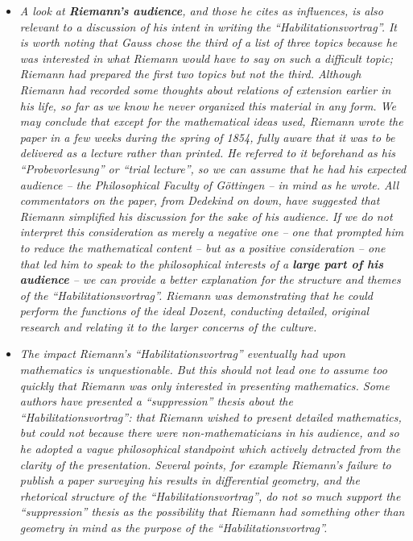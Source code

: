 \documentclass[12pt]{article}
\begin{document}
\begin{itemize}
\begin{itemize}
\item[]{\it A look at {\bf Riemann's audience}, and those he cites as influences, is also relevant to a discussion of his intent in writing the ``Habilitationsvortrag''. It is worth noting that Gauss chose the third of a list of three topics because he was interested in what Riemann would have to say on such a difficult topic; Riemann had prepared the first two topics but not the third. Although Riemann had recorded some thoughts about relations of extension earlier in his life, so far as we know he never organized this material in any form. We may conclude that except for the mathematical ideas used, Riemann wrote the paper in a few weeks during the spring of 1854, fully aware that it was to be delivered as a lecture rather than printed. He referred to it beforehand as his ``Probevorlesung'' or ``trial lecture'', so we can assume that he had his expected audience -- the Philosophical Faculty of G\"ottingen -- in mind as he wrote. All commentators on the paper, from Dedekind on down, have suggested that Riemann simplified his discussion for the sake of his audience. If we do not interpret this consideration as merely a negative one -- one that prompted him to reduce the mathematical content -- but as a positive consideration -- one that led him to speak to the philosophical interests of a {\bf large part of his audience} -- we can provide a better explanation for the structure and themes of the ``Habilitationsvortrag''. Riemann was demonstrating that he could perform the functions of the ideal Dozent, conducting detailed, original research and relating it to the larger concerns of the culture.}

\item[]{\it The impact Riemann's ``Habilitationsvortrag'' eventually had upon mathematics is unquestionable. But this should not lead one to assume too quickly that Riemann was only interested in presenting mathematics. Some authors have presented a ``suppression'' thesis about the ``Habilitationsvortrag'': that Riemann wished to present detailed mathematics, but could not because there were non-mathematicians in his audience, and so he adopted a vague philosophical standpoint which actively detracted from the clarity of the presentation. Several points, for example Riemann's failure to publish a paper surveying his results in differential geometry, and the rhetorical structure of the ``Habilitationsvortrag'', do not so much support the ``suppression'' thesis as the possibility that Riemann had something other than geometry in mind as the purpose of the ``Habilitationsvortrag''.}


\end{itemize}
\end{itemize}
\end{document}
